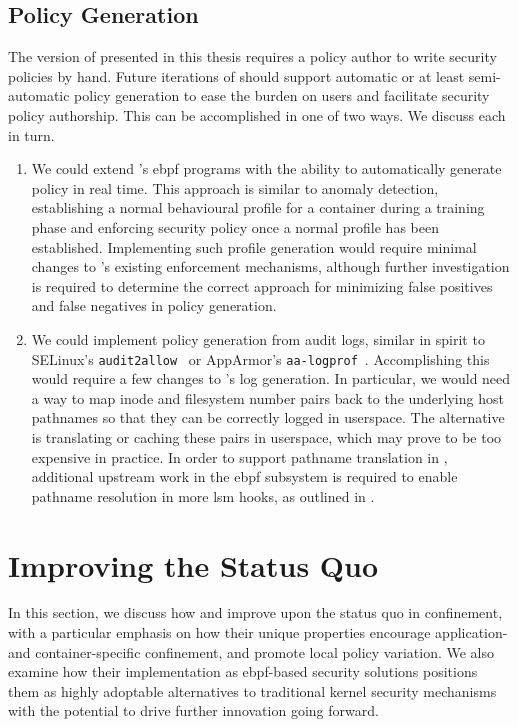 \subsection{\bpfcontain{} Policy Generation}

The version of \bpfcontain{} presented in this thesis requires a policy author to write
security policies by hand. Future iterations of \bpfcontain{} should support automatic or
at least semi-automatic policy generation to ease the burden on users and facilitate
security policy authorship. This can be accomplished in one of two ways.  We discuss each
in turn.

\begin{enumerate}
  \item We could extend \bpfcontain{}'s \gls{ebpf} programs with the ability to
  automatically generate policy in real time. This approach is similar to
  anomaly detection, establishing a normal behavioural profile for
  a container during a training phase and enforcing security policy once a normal profile
  has been established. Implementing such profile generation would require minimal changes
  to \bpfcontain{}'s existing enforcement mechanisms, although further investigation is
  required to determine the correct approach for minimizing false positives and false
  negatives in policy generation.

  \item We could implement policy generation from audit logs, similar in spirit to
  SELinux's \texttt{audit2allow}~\cite{audit2allow} or AppArmor's
  \texttt{aa-logprof}~\cite{aa_logprof}. Accomplishing this would require a few changes to
  \bpfcontain{}'s log generation. In particular, we would need a way to map inode and
  filesystem number pairs back to the underlying host pathnames so that they can be
  correctly logged in userspace.  The alternative is translating or caching these pairs in
  userspace, which may prove to be too expensive in practice.  In order to support
  pathname translation in \bpfcontain{}, additional upstream work in the \gls{ebpf}
  subsystem is required to enable pathname resolution in more \gls{lsm} hooks, as outlined
  in .
\end{enumerate}


\section{Improving the Status Quo}%
\label{s:disc-improving}

In this section, we discuss how \bpfbox{} and \bpfcontain{} improve upon the status quo in
confinement, with a particular emphasis on how their unique properties encourage
application- and container-specific confinement, and promote local policy variation. We
also examine how their implementation as \gls{ebpf}-based security solutions positions
them as highly adoptable alternatives to traditional kernel security mechanisms with the
potential to drive further innovation going forward.

